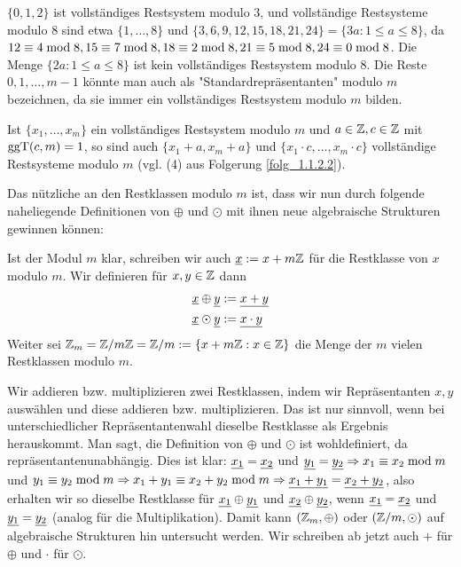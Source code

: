 \begin{bsp}
	$\{0,1,2\}$ ist vollständiges Restsystem modulo $3$, und vollständige Restsysteme modulo $8$ sind etwa $\{1,\dots,8\}$ und $\{3,6,9,12,15,18,21,24\} = \{3a : 1 \leq a \leq 8\}$, da $12 \kon 4 \modu 8, 15 \kon 7 \modu 8, 18 \kon 2 \modu 8,\linebreak 21 \kon 5 \modu 8, 24 \kon 0 \modu 8$. 
	Die Menge $\{2a : 1 \leq a \leq 8\}$ ist kein vollständiges Restsystem modulo $8$. 
	Die Reste $0,1,\dots,m-1$ könnte man auch als "Standardrepräsentanten" modulo $m$ bezeichnen, da sie immer ein vollständiges Restsystem modulo $m$ bilden.
\end{bsp}

\begin{folg}
	Ist $\{x_1,\dots,x_m\}$ ein vollständiges Restsystem modulo $m$ und $a \in \mathbb{Z},  c\in \mathbb{Z}$ mit $\operatorname{ggT}(c,m) = 1$, so sind auch $\{x_1 + a, x_m + a\}$ und $\{x_1 \cdot c, \dots, x_m \cdot c\}$ vollständige Restsysteme modulo $m$ (vgl. (4) aus Folgerung \ref{folg_1.1.2.2}).
\end{folg}

Das nützliche an den Restklassen modulo $m$ ist, dass wir nun durch folgende naheliegende Definitionen von $\oplus$ und $\odot$ mit ihnen neue algebraische Strukturen gewinnen können:
\begin{defn}
	Ist der Modul $m$ klar, schreiben wir auch $\underline{x} := x+m\mathbb{Z}$ für die Restklasse von $x$ modulo $m$. 
	Wir definieren für $x,y \in \mathbb{Z}$ dann
	\begin{equation}
	\begin{aligned}
		\underline{x} \oplus \underline{y} &:= \underline{x+y} \\
		\underline{x} \odot \underline{y} &:= \underline{x \cdot y}
	\end{aligned}
	\end{equation}
	Weiter sei $\mathbb{Z}_m = \mathbb{Z}/m\mathbb{Z} = \mathbb{Z}/m := \{x + m\mathbb{Z} : x \in \mathbb{Z}\}$ die Menge der $m$ vielen Restklassen modulo $m$.
\end{defn}

\begin{folg}
	Wir addieren bzw. multiplizieren zwei Restklassen, indem wir Repräsentanten $x,y$ auswählen und diese addieren bzw. multiplizieren. 
	Das ist nur sinnvoll, wenn bei unterschiedlicher Repräsentantenwahl dieselbe Restklasse als Ergebnis herauskommt. 
	Man sagt, die Definition von $\oplus$ und $\odot$ ist wohldefiniert, da repräsentantenunabhängig. 
	Dies ist klar: $\underline{x_1} = \underline{x_2}$ und $\underline{y_1} = \underline{y_2} \Rightarrow x_1 \equiv x_2 \bmod m$ und $y_1 \equiv y_2 \bmod m \Rightarrow x_1 + y_1 \equiv x_2 +y_2 \bmod m \Rightarrow \underline{x_1+y_1} = \underline{x_2 + y_2}$, also erhalten wir so dieselbe Restklasse für $\underline{x_1} \oplus \underline{y_1}$ und $\underline{x_2} \oplus \underline{y_2}$, wenn $\underline{x_1} = \underline{x_2}$ und $\underline{y_1} = \underline{y_2}$ (analog für die Multiplikation). 
	Damit kann $(\mathbb{Z}_m,\oplus)$ oder $(\mathbb{Z}/m,\odot)$ auf algebraische Strukturen hin untersucht werden. 
	Wir schreiben ab jetzt auch $+$ für $\oplus$ und $\cdot$ für $\odot$.
\end{folg}

